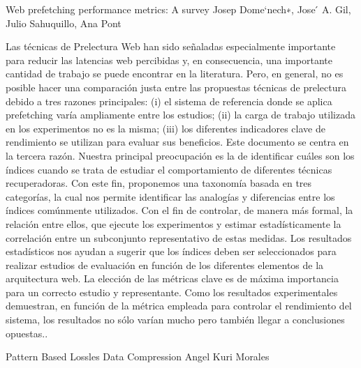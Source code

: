 Web prefetching performance metrics: A survey 
Josep Dome`nech∗, Jose ́ A. Gil, Julio Sahuquillo, Ana Pont

Las técnicas de Prelectura Web  han sido señaladas  especialmente importante para reducir las latencias web percibidas y, en consecuencia, una importante cantidad de trabajo se puede encontrar en la literatura. Pero, en general, no es posible hacer una comparación justa entre las propuestas técnicas de prelectura debido a tres razones principales: (i) el sistema de referencia donde se aplica prefetching varía ampliamente entre los estudios; (ii) la carga de trabajo utilizada en los experimentos no es la misma; (iii) los diferentes indicadores clave de rendimiento se utilizan para evaluar sus beneficios.
Este documento se centra en la tercera razón. Nuestra principal preocupación es la de identificar cuáles son los índices cuando se trata de estudiar el comportamiento de diferentes técnicas recuperadoras. Con este fin, proponemos una taxonomía basada en tres categorías, la cual nos permite identificar las analogías y diferencias entre los índices comúnmente utilizados. Con el fin de controlar, de manera más formal, la relación entre ellos, que ejecute los experimentos y estimar estadísticamente la correlación entre un subconjunto representativo de estas medidas. Los resultados estadísticos nos ayudan a sugerir que los índices deben ser seleccionados para realizar estudios de evaluación en función de los diferentes elementos de la arquitectura web.
La elección de las métricas clave es de máxima importancia para un correcto estudio y representante. Como los resultados experimentales demuestran, en función de la métrica empleada para controlar el rendimiento del sistema, los resultados no sólo varían mucho pero también llegar a conclusiones opuestas..



Pattern Based Lossles Data Compression
Angel Kuri Morales


